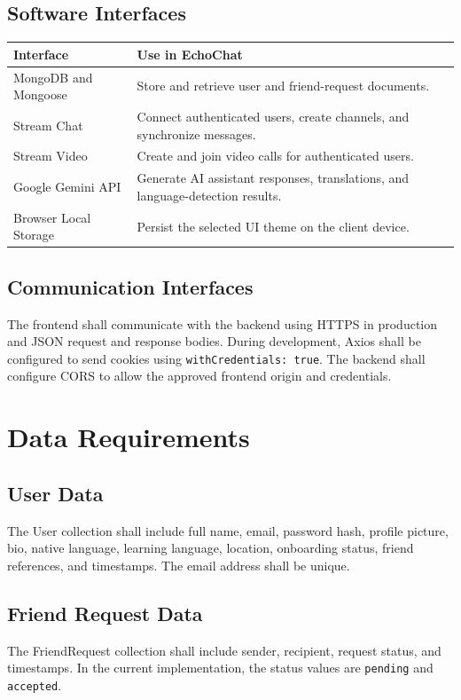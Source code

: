 \documentclass[12pt,a4paper]{report}
\begin{document}
\section{Software Interfaces}
\begin{longtable}{|p{1.7in}|p{4.4in}|}
\hline
\rowcolor{gray!25}\textbf{Interface} & \textbf{Use in EchoChat} \\ \hline
MongoDB and Mongoose & Store and retrieve user and friend-request documents. \\ \hline
Stream Chat & Connect authenticated users, create channels, and synchronize messages. \\ \hline
Stream Video & Create and join video calls for authenticated users. \\ \hline
Google Gemini API & Generate AI assistant responses, translations, and language-detection results. \\ \hline
Browser Local Storage & Persist the selected UI theme on the client device. \\ \hline
\end{longtable}

\section{Communication Interfaces}
The frontend shall communicate with the backend using HTTPS in production and JSON request and response bodies. During development, Axios shall be configured to send cookies using \texttt{withCredentials: true}. The backend shall configure CORS to allow the approved frontend origin and credentials.

\chapter{Data Requirements}
\section{User Data}
The User collection shall include full name, email, password hash, profile picture, bio, native language, learning language, location, onboarding status, friend references, and timestamps. The email address shall be unique.

\section{Friend Request Data}
The FriendRequest collection shall include sender, recipient, request status, and timestamps. In the current implementation, the status values are \texttt{pending} and \texttt{accepted}.
\end{document}
